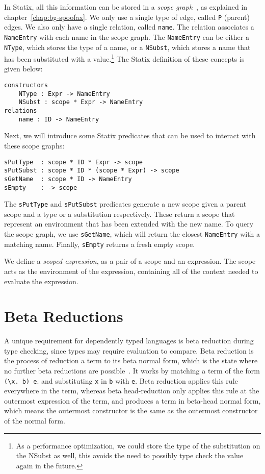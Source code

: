 In Statix, all this information can be stored in a \emph{scope graph}~\cite{scope_graphs}, as explained in chapter~\ref{chap:bg-spoofax}. We only use a single type of edge, called \verb|P| (parent) edges. We also only have a single relation, called \verb|name|. The relation associates a \verb|NameEntry| with each name in the scope graph. The \verb|NameEntry| can be either a \verb|NType|, which stores the type of a name, or a \verb|NSubst|, which stores a name that has been substituted with a value.\footnote{As a performance optimization, we could store the type of the substitution on the NSubst as well, this avoids the need to possibly type check the value again in the future.} The Statix definition of these concepts is given below:
\begin{lstlisting}
constructors
    NType : Expr -> NameEntry
    NSubst : scope * Expr -> NameEntry
relations
    name : ID -> NameEntry
\end{lstlisting}

Next, we will introduce some Statix predicates that can be used to interact with these scope graphs:

\begin{lstlisting}
sPutType  : scope * ID * Expr -> scope
sPutSubst : scope * ID * (scope * Expr) -> scope
sGetName  : scope * ID -> NameEntry
sEmpty    : -> scope
\end{lstlisting}
The \verb|sPutType| and \verb|sPutSubst| predicates generate a new scope given a parent scope and a type or a substitution respectively. These return a scope that represent an environment that has been extended with the new name. To query the scope graph, we use \verb|sGetName|, which will return the closest \verb|NameEntry| with a matching name. Finally, \verb|sEmpty| returns a fresh empty scope.

We define a \emph{scoped expression}, as a pair of a scope and an expression. The scope acts as the environment of the expression, containing all of the context needed to evaluate the expression.

\section{Beta Reductions}
\label{sec:coc-dynsyms}

A unique requirement for dependently typed languages is beta reduction during type checking, since types may require evaluation to compare. Beta reduction is the process of reduction a term to its beta normal form, which is the state where no further beta reductions are possible~\cite{tapl}. It works by matching a term of the form \verb|(\x. b) e|. and substituting \verb|x| in \verb|b| with \verb|e|. Beta reduction applies this rule everywhere in the term, whereas beta head-reduction only applies this rule at the outermost expression of the term, and produces a term in beta-head normal form, which means the outermost constructor is the same as the outermost constructor of the normal form.

